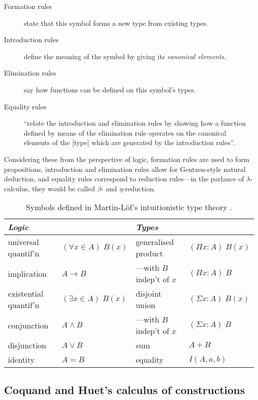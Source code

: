 \documentclass[12pt,toc=bibliography,numbers=noendperiod,
               footnotes=multiple,twoside]{scrartcl}
\begin{document}
\begin{description}
\item[Formation rules] state that this symbol forms a new type from existing types.
\item[Introduction rules] define the meaning of the symbol by giving its \emph{canonical elements}.
\item[Elimination rules] say how functions can be defined on this symbol's types.
\item[Equality rules] \enquote{relate the introduction and elimination rules by showing how a function defined by means of the elimination rule operates on the canonical elements of the [type] which are generated by the introduction rules}.
\end{description}

Considering these from the perspective of logic, formation rules are used to form propositions, introduction and elimination rules allow for Gentzen-style natural deduction, and equality rules correspond to reduction rules---in the parlance of \(\lambda\)-calculus, they would be called \(\beta\)- and \(\eta\)-reduction.

\begin{table}[h]
    \centering
    \begin{tabular}{l l l l}
        \toprule
        \textit{Logic} & & \textit{Types} & \\
        \midrule
	universal quantif'n & \((\forall x \in A)\;B(x)\)
		& generalised product & \((\Pi x : A)\;B(x)\) \\
	implication & \(A \rightarrow B\)
		& ---with \(B\) indep't of \(x\) & \((\Pi x : A)\;B\) \\
	existential quantif'n & \((\exists x \in A)\;B(x)\)
		& disjoint union & \((\Sigma x : A)\;B(x)\) \\
	conjunction & \(A \wedge B\)
		& ---with \(B\) indep't of \(x\) & \((\Sigma x : A)\;B\) \\
	disjunction & \(A \vee B\)
		& sum & \(A + B\) \\
	identity & \(A = B\)
		& equality & \(I(A, a, b)\) \\
	
        \bottomrule
    \end{tabular}
    \caption{Symbols defined in Martin-Löf's intuitionistic type theory \parencite{sambin_intuitionistic_1984}.}
    \label{tab:martin-loef}
\end{table}

\subsection{Coquand and Huet's calculus of constructions}
\end{document}
